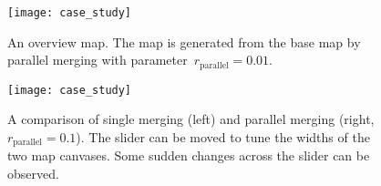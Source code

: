 \documentclass{ica}
\begin{document}
\begin{figure}[tb]
\centering
\texttt{[image: case\_study]}
\caption{An overview map. The map is generated from the base map 
    by parallel merging with parameter~$r_\mathrm{parallel}= 0.01$.}
\label{fig:web_map}
\end{figure}


\begin{figure}[tb]
\centering
\texttt{[image: case\_study]}
\caption{
    A comparison of single merging (left) 
    and parallel merging (right, $r_\mathrm{parallel}= 0.1$).
    The slider can be moved to tune the widths of the two map canvases.
    Some sudden changes across the slider can be observed.
}
\label{fig:comparison}
\end{figure}
\end{document}
